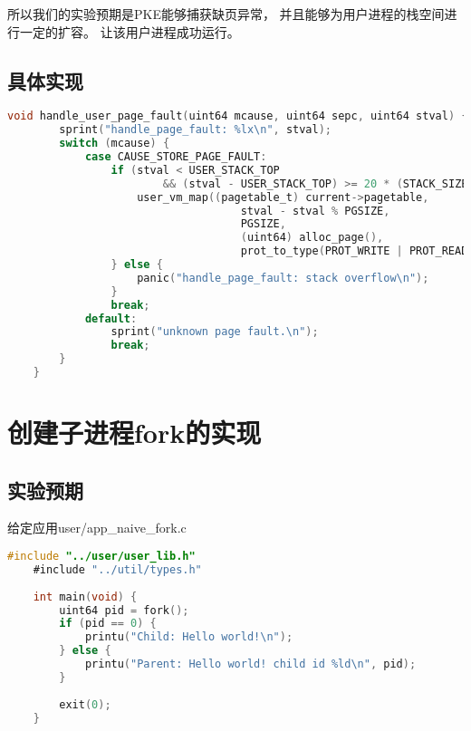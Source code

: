 所以我们的实验预期是PKE能够捕获缺页异常，
并且能够为用户进程的栈空间进行一定的扩容。
让该用户进程成功运行。

\subsection{具体实现}

\begin{lstlisting}[caption={handle\_page\_fault}, label={lst:handle_page_fault}, language=C]
    void handle_user_page_fault(uint64 mcause, uint64 sepc, uint64 stval) {
        sprint("handle_page_fault: %lx\n", stval);
        switch (mcause) {
            case CAUSE_STORE_PAGE_FAULT:
                if (stval < USER_STACK_TOP 
                        && (stval - USER_STACK_TOP) >= 20 * (STACK_SIZE)) {
                    user_vm_map((pagetable_t) current->pagetable,
                                    stval - stval % PGSIZE, 
                                    PGSIZE, 
                                    (uint64) alloc_page(),
                                    prot_to_type(PROT_WRITE | PROT_READ, 1));
                } else {
                    panic("handle_page_fault: stack overflow\n");
                }
                break;
            default:
                sprint("unknown page fault.\n");
                break;
        }
    }    
\end{lstlisting}

\section{创建子进程fork的实现}

\subsection{实验预期}

给定应用user/app\_naive\_fork.c

\begin{lstlisting}[caption={用户态应用app\_naive\_fork.c}, label={lst:app_naive_fork}, language=C]
    #include "../user/user_lib.h"
    #include "../util/types.h"
    
    int main(void) {
        uint64 pid = fork();
        if (pid == 0) {
            printu("Child: Hello world!\n");
        } else {
            printu("Parent: Hello world! child id %ld\n", pid);
        }
    
        exit(0);
    }
       
\end{lstlisting}

